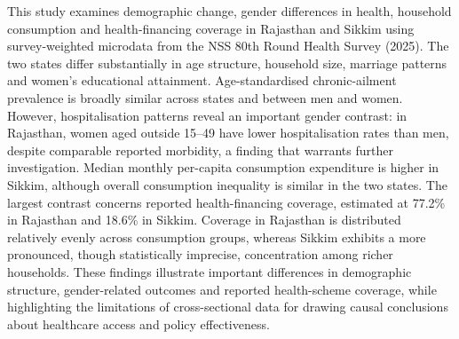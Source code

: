\begin{titlepage}
\begin{minipage}{0.88\textwidth}
This study examines demographic change, gender differences in health, household consumption and health-financing coverage in Rajasthan and Sikkim using survey-weighted microdata from the NSS 80th Round Health Survey (2025). The two states differ substantially in age structure, household size, marriage patterns and women's educational attainment. Age-standardised chronic-ailment prevalence is broadly similar across states and between men and women. However, hospitalisation patterns reveal an important gender contrast: in Rajasthan, women aged outside 15–49 have lower hospitalisation rates than men, despite comparable reported morbidity, a finding that warrants further investigation. Median monthly per-capita consumption expenditure is higher in Sikkim, although overall consumption inequality is similar in the two states. The largest contrast concerns reported health-financing coverage, estimated at 77.2\% in Rajasthan and 18.6\% in Sikkim. Coverage in Rajasthan is distributed relatively evenly across consumption groups, whereas Sikkim exhibits a more pronounced, though statistically imprecise, concentration among richer households. These findings illustrate important differences in demographic structure, gender-related outcomes and reported health-scheme coverage, while highlighting the limitations of cross-sectional data for drawing causal conclusions about healthcare access and policy effectiveness.\par
    \end{minipage}

    \vfill
\end{titlepage}